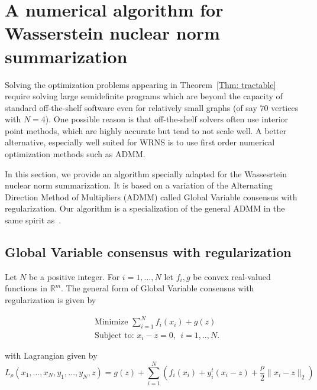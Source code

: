 \documentclass[12pt]{amsart}
\theoremstyle{remark}
\newcommand{\RR}{\mathbb{R}}
\begin{document}
\section{A numerical algorithm for Wasserstein nuclear norm summarization }



Solving the optimization problems appearing in Theorem~\ref{Thm: tractable} require solving large semidefinite programs which are beyond the  capacity of standard off-the-shelf software even for relatively small graphs (of say $70$ vertices with $N=4$). One possible reason is that off-the-shelf solvers often use interior point methods, which are highly accurate but tend to not scale well. A better alternative, especially well suited for WRNS is to use first order numerical optimization methods such as ADMM.

In this section, we provide an algorithm specially adapted for the Wassesrtein nuclear norm summarization. It is based on a variation of the Alternating Direction Method of Multipliers (ADMM) called Global Variable consensus with regularization. Our algorithm is a specialization of the general ADMM in the same spirit as~\cite{LinChenMa}.


\subsection{Global Variable consensus with regularization}


Let $N$ be a positive integer. For $i=1,\dots, N$ let $f_i,g$ be convex real-valued functions in $\RR^m$. The general form of Global Variable consensus with regularization is given by 



\begin{equation}\label{GVC}
\begin{aligned}
& \text{Minimize   } \sum_{i=1}^N f_i(x_i)+g(z) \\
&\text{Subject to: } x_i-z = 0, \ \ i=1,..,N. 
\end{aligned}
\end{equation}

with Lagrangian given by
\[L_\rho(x_1,\dots, x_N,y_1,\dots, y_N,z)= g(z)+\sum_{i=1}^N \left(f_i(x_i) + y_i^t(x_i-z) + \frac{\rho}{2}\|x_i-z\|_2\right)\]
\end{document}
